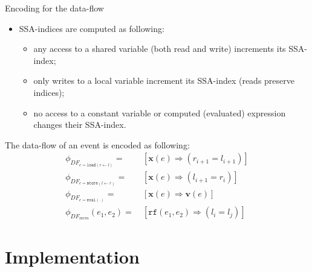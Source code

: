 \documentclass{beamer}
\newcommand*{\fx}{\ensuremath{\mathbf{x}}}%
\newcommand*{\fv}{\ensuremath{\mathbf{v}}} %
\newcommand{\defeq}{\ensuremath{=}}%
\begin{document}
\begin{frame}{Encoding for the data-flow}

\begin{itemize}
\item SSA-indices are computed as following:
\begin{itemize}
  \item any access to a shared variable (both read and write) increments its SSA-index;
  \item only writes to a local variable increment its SSA-index (reads preserve indices);
  \item no access to a constant variable or computed (evaluated) expression changes their SSA-index.
\end{itemize}
\end{itemize}

The data-flow of an event is encoded as following:
\begin{align}
    \phi_{DF_{e = \texttt{load}(r \leftarrow l)}}  \defeq \ & [\fx(e) \Rightarrow (r_{i+1} = l_{i+1})] \nonumber \\
    \phi_{DF_{e = \texttt{store}(l \leftarrow r)}} \defeq \ & [\fx(e) \Rightarrow (l_{i+1} = r_i)] \nonumber\\
    \phi_{DF_{e = \texttt{eval}(\cdot)}}           \defeq \ & [\fx(e) \Rightarrow \fv(e)] \nonumber \\
    \phi_{DF_{mem}}(e_1, e_2) \defeq \ & [\texttt{rf}(e_1, e_2) \Rightarrow (l_i = l_j)] \nonumber
\end{align}
\end{frame}


\section{Implementation}
\end{document}
